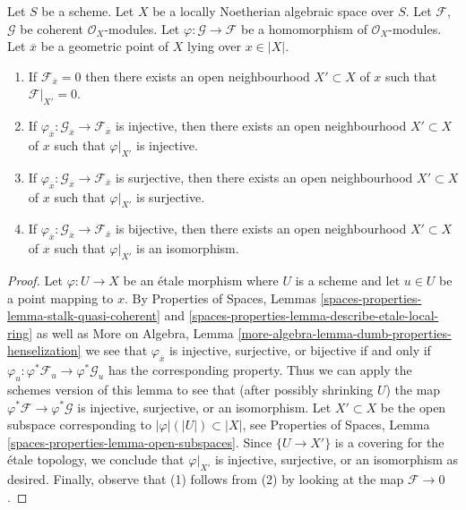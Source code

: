 \begin{lemma}
\label{lemma-local-isomorphism}
Let $S$ be a scheme. Let $X$ be a locally Noetherian algebraic space over $S$.
Let $\mathcal{F}$, $\mathcal{G}$ be coherent $\mathcal{O}_X$-modules.
Let $\varphi : \mathcal{G} \to \mathcal{F}$ be a homomorphism
of $\mathcal{O}_X$-modules. Let $\overline{x}$ be a geometric point of $X$
lying over $x \in |X|$.
\begin{enumerate}
\item If $\mathcal{F}_{\overline{x}} = 0$ then there exists an open
neighbourhood $X' \subset X$ of $x$ such that $\mathcal{F}|_{X'} = 0$.
\item If $\varphi_{\overline{x}} : \mathcal{G}_{\overline{x}} \to
\mathcal{F}_{\overline{x}}$ is injective, then there exists an open
neighbourhood $X' \subset X$ of $x$ such that $\varphi|_{X'}$ is injective.
\item If $\varphi_{\overline{x}} : \mathcal{G}_{\overline{x}} \to
\mathcal{F}_{\overline{x}}$ is surjective, then there exists an open
neighbourhood $X' \subset X$ of $x$ such that $\varphi|_{X'}$ is surjective.
\item If $\varphi_{\overline{x}} : \mathcal{G}_{\overline{x}} \to
\mathcal{F}_{\overline{x}}$ is bijective, then there exists an open
neighbourhood $X' \subset X$ of $x$ such that $\varphi|_{X'}$ is an isomorphism.
\end{enumerate}
\end{lemma}

\begin{proof}
Let $\varphi : U \to X$ be an \'etale morphism where $U$ is a scheme and
let $u \in U$ be a point mapping to $x$. By
Properties of Spaces, Lemmas
\ref{spaces-properties-lemma-stalk-quasi-coherent} and
\ref{spaces-properties-lemma-describe-etale-local-ring}
as well as
More on Algebra, Lemma \ref{more-algebra-lemma-dumb-properties-henselization}
we see that $\varphi_{\overline{x}}$ is injective, surjective, or bijective
if and only if $\varphi_u : \varphi^*\mathcal{F}_u \to \varphi^*\mathcal{G}_u$
has the corresponding property. Thus we can apply the schemes version of
this lemma to see that (after possibly shrinking $U$) the map
$\varphi^*\mathcal{F} \to \varphi^*\mathcal{G}$ is injective, surjective,
or an isomorphism. Let $X' \subset X$ be the open subspace corresponding
to $|\varphi|(|U|) \subset |X|$, see
Properties of Spaces, Lemma \ref{spaces-properties-lemma-open-subspaces}.
Since $\{U \to X'\}$ is a covering for the \'etale topology, we conclude
that $\varphi|_{X'}$ is injective, surjective, or an isomorphism as desired.
Finally, observe that (1) follows from (2) by looking at the map
$\mathcal{F} \to 0$.
\end{proof}

